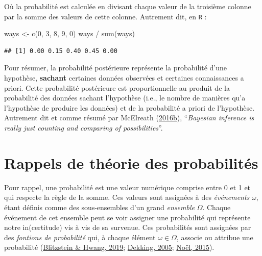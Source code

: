 \documentclass[
  a4paper,11pt,twoside,onecolumn,openright,final,oldfontcommands]{memoir}
\newenvironment{Shaded}{\begin{snugshade}}{\end{snugshade}}
\newcommand{\DecValTok}[1]{\textcolor[rgb]{0.00,0.00,0.81}{#1}}
\newcommand{\FunctionTok}[1]{\textcolor[rgb]{0.00,0.00,0.00}{#1}}
\newcommand{\NormalTok}[1]{#1}
\newcommand{\OtherTok}[1]{\textcolor[rgb]{0.56,0.35,0.01}{#1}}
\newcommand{\SpecialCharTok}[1]{\textcolor[rgb]{0.00,0.00,0.00}{#1}}
\theoremstyle{definition}
\theoremstyle{definition}
\theoremstyle{definition}
\theoremstyle{definition}
\theoremstyle{remark}
\begin{document}
Où la probabilité est calculée en divisant chaque valeur de la troisième colonne par la somme des valeurs de cette colonne. Autrement dit, en \texttt{R} :

\begin{Shaded}
\begin{Highlighting}[]
\NormalTok{ways }\OtherTok{\textless{}{-}} \FunctionTok{c}\NormalTok{(}\DecValTok{0}\NormalTok{, }\DecValTok{3}\NormalTok{, }\DecValTok{8}\NormalTok{, }\DecValTok{9}\NormalTok{, }\DecValTok{0}\NormalTok{)}
\NormalTok{ways }\SpecialCharTok{/} \FunctionTok{sum}\NormalTok{(ways)}
\end{Highlighting}
\end{Shaded}

\begin{verbatim}
## [1] 0.00 0.15 0.40 0.45 0.00
\end{verbatim}

Pour résumer, la probabilité postérieure représente la probabilité d'une hypothèse, \textbf{sachant} certaines données observées et certaines connaissances a priori. Cette probabilité postérieure est proportionnelle au produit de la probabilité des données sachant l'hypothèse (i.e., le nombre de manières qu'a l'hypothèse de produire les données) et de la probabilité a priori de l'hypothèse. Autrement dit et comme résumé par McElreath (\protect\hyperlink{ref-mcelreath_statistical_2016}{2016b}), ``\emph{Bayesian inference is really just counting and comparing of possibilities}''.

\hypertarget{rappels-de-thuxe9orie-des-probabilituxe9s}{%
\section{Rappels de théorie des probabilités}\label{rappels-de-thuxe9orie-des-probabilituxe9s}}

Pour rappel, une probabilité est une valeur numérique comprise entre 0 et 1 et qui respecte la règle de la somme. Ces valeurs sont assignées à des \emph{événements} \(\omega\), étant définis comme des sous-ensembles d'un grand \emph{ensemble} \(\Omega\). Chaque événement de cet ensemble peut se voir assigner une probabilité qui représente notre in(certitude) vis à vis de sa survenue. Ces probabilités sont assignées par des \emph{fontions de probabilité} qui, à chaque élément \(\omega \in \Omega\), associe ou attribue une probabilité (\protect\hyperlink{ref-blitzstein_introduction_2019}{Blitzstein \& Hwang, 2019}; \protect\hyperlink{ref-dekking_modern_2005}{Dekking, 2005}; \protect\hyperlink{ref-noel_psychologie_2015}{Noël, 2015}).
\end{document}
